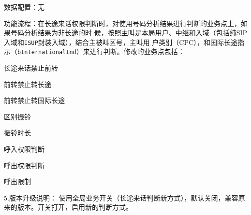 \documentclass[12pt,a4paper,onecolumn]{article}
\begin{document}
数据配置：无

功能流程：在长途来话权限判断时，对使用号码分析结果进行判断的业务点上，如果号码分析结果为非长途的时
候，按照主叫是本局用户、中继和入域（包括纯SIP入域和\lstinline{ISUP}封装入域），结合主被叫区号，主叫用
户类别（CPC），和国际长途指示（\lstinline{bInternationalInd}）来进行判断。修改的业务点包括：

长途来话禁止前转

前转禁止转长途

前转禁止转国际长途

区别振铃

振铃时长

呼入权限判断

呼出权限判断

呼出限制

5.版本升级说明： 使用全局业务开关（长途来话判断新方式），默认关闭，兼容原来的版本。开关打开，启用新的判断方式。
\end{document}
